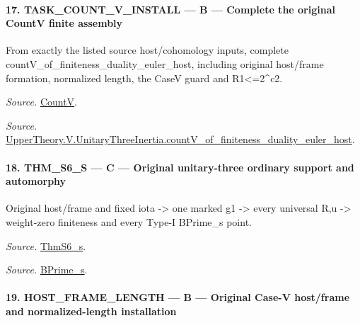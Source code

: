 \paragraph{17. TASK\_\allowbreak COUNT\_\allowbreak V\_\allowbreak INSTALL — B — Complete the original CountV finite assembly}

From exactly the listed source host/cohomology inputs, complete countV\_\allowbreak of\_\allowbreak finiteness\_\allowbreak duality\_\allowbreak euler\_\allowbreak host, including original host/frame formation, normalized length, the CaseV guard and R1<=2\textasciicircum{}c2.

\emph{Source.} \href{https://github.com/CocoSgt/riemann-hypothesis-lean/blob/7cbf7a0c32fca1badf05931879a37c3f8a2b03b4/src/Development/AutomorphicArithmetic/AutomorphicVarieties/HeightAndVanishing/Counts.lean#L69-L69}{CountV}.

\emph{Source.} \href{https://github.com/CocoSgt/riemann-hypothesis-lean/blob/7cbf7a0c32fca1badf05931879a37c3f8a2b03b4/src/Development/AutomorphicArithmetic/AutomorphicVarieties/ModularityArgument/ThresholdArguments/DenseThresholdCases/CountVOf.lean#L33-L60}{UpperTheory.V.UnitaryThreeInertia.countV\_\allowbreak of\_\allowbreak finiteness\_\allowbreak duality\_\allowbreak euler\_\allowbreak host}.



\paragraph{18. THM\_\allowbreak S6\_\allowbreak S — C — Original unitary-three ordinary support and automorphy}

Original host/frame and fixed iota -> one marked g1 -> every universal R,u -> weight-zero finiteness and every Type-I BPrime\_\allowbreak s point.

\emph{Source.} \href{https://github.com/CocoSgt/riemann-hypothesis-lean/blob/7cbf7a0c32fca1badf05931879a37c3f8a2b03b4/src/Development/AutomorphicArithmetic/AutomorphicVarieties/ModularityArgument/ThresholdArguments/DenseThresholdCases/ThmS6CoreS.lean#L17-L26}{ThmS6\_\allowbreak s}.

\emph{Source.} \href{https://github.com/CocoSgt/riemann-hypothesis-lean/blob/7cbf7a0c32fca1badf05931879a37c3f8a2b03b4/src/Development/AutomorphicArithmetic/AutomorphicVarieties/ModularityArgument/ThresholdArguments/DenseThresholdCases/ThmS6CoreS.lean#L12-L16}{BPrime\_\allowbreak s}.



\paragraph{19. HOST\_\allowbreak FRAME\_\allowbreak LENGTH — B — Original Case-V host/frame and normalized-length installation}

